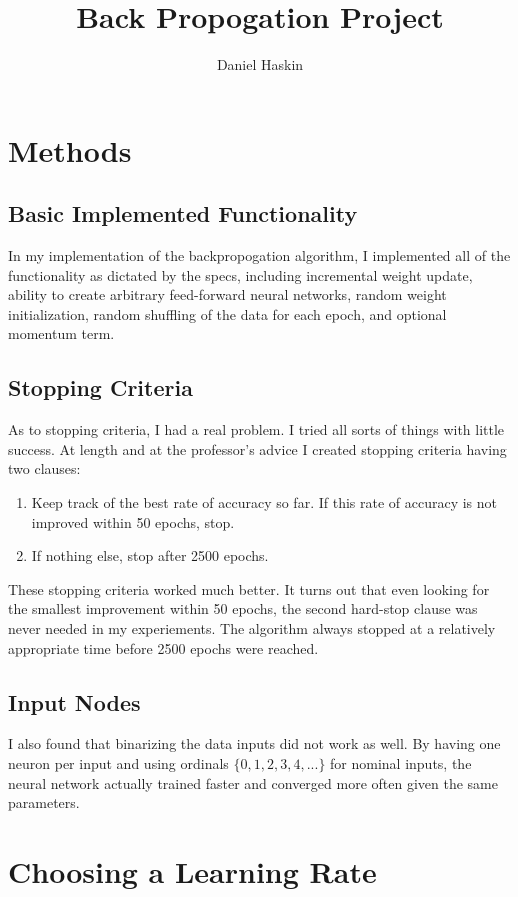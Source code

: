 \documentclass[12pt]{article}
\title{Back Propogation Project}
\author{Daniel Haskin}
\begin{document}
\maketitle
\section{Methods}
\subsection{Basic Implemented Functionality}
In my implementation of the backpropogation algorithm, I implemented all of the
functionality as dictated by the specs, including incremental weight update,
ability to create arbitrary feed-forward neural networks, random weight
initialization, random shuffling of the data for each epoch, and optional
momentum term.
\subsection{Stopping Criteria}
As to stopping criteria, I had a real problem. I tried all sorts of things
with little success. At length and at the professor's advice I created stopping
criteria having two clauses:
\begin{enumerate}
    \item Keep track of the best rate of accuracy so far. If this rate of
        accuracy is not improved within 50 epochs, stop.
    \item If nothing else, stop after 2500 epochs.
\end{enumerate}
These stopping criteria worked much better. It turns out that even looking
for the smallest improvement within 50 epochs, the second hard-stop clause
was never needed in my experiements. The algorithm always stopped at a
relatively appropriate time before 2500 epochs were reached.
\subsection{Input Nodes}
I also found that binarizing the data inputs did not work as well. By having
one neuron per input and using ordinals $\{0,1,2,3,4,...\}$ for nominal
inputs, the neural network actually trained faster and converged more often
given the same parameters.
\section{Choosing a Learning Rate}
\end{document}

